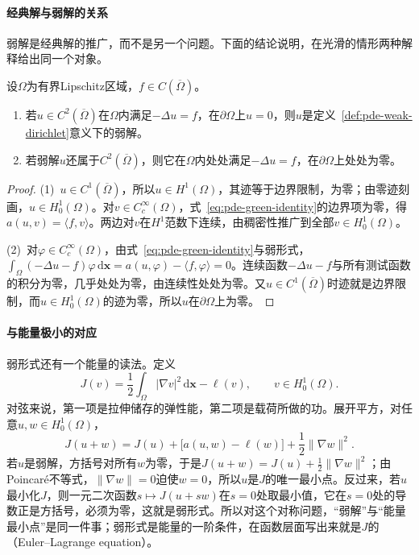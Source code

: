 \paragraph{经典解与弱解的关系}
弱解是经典解的推广，而不是另一个问题。下面的结论说明，在光滑的情形两种解释给出同一个对象。

\begin{theorem}[经典解与弱解]
\label{thm:pde-classical-weak}
设$\Omega$为有界Lipschitz区域，$f\in C(\overline\Omega)$。
\begin{enumerate}
  \item 若$u\in C^2(\overline\Omega)$在$\Omega$内满足$-\Delta u=f$，在$\partial\Omega$上$u=0$，则$u$是定义~\ref{def:pde-weak-dirichlet}意义下的弱解。
  \item 若弱解$u$还属于$C^2(\overline\Omega)$，则它在$\Omega$内处处满足$-\Delta u=f$，在$\partial\Omega$上处处为零。
\end{enumerate}
\end{theorem}

\begin{proof}
(1)~$u\in C^1(\overline\Omega)$，所以$u\in H^1(\Omega)$，其迹等于边界限制，为零；由零迹刻画，$u\in H_0^1(\Omega)$。对$v\in C_c^\infty(\Omega)$，式~\eqref{eq:pde-green-identity}的边界项为零，得$a(u,v)=\langle f,v\rangle$。两边对$v$在$H^1$范数下连续，由稠密性推广到全部$v\in H_0^1(\Omega)$。

(2)~对$\varphi\in C_c^\infty(\Omega)$，由式~\eqref{eq:pde-green-identity}与弱形式，$\int_\Omega(-\Delta u-f)\varphi\,\mathrm d\bm x=a(u,\varphi)-\langle f,\varphi\rangle=0$。连续函数$-\Delta u-f$与所有测试函数的积分为零，几乎处处为零，由连续性处处为零。又$u\in C^1(\overline\Omega)$时迹就是边界限制，而$u\in H_0^1(\Omega)$的迹为零，所以$u$在$\partial\Omega$上为零。
\end{proof}

\paragraph{与能量极小的对应}
弱形式还有一个能量的读法。定义
\begin{equation}
  J(v)=\frac12\int_\Omega|\nabla v|^2\,\mathrm d\bm x-\ell(v),\qquad v\in H_0^1(\Omega).
  \label{eq:pde-dirichlet-energy}
\end{equation}
对弦来说，第一项是拉伸储存的弹性能，第二项是载荷所做的功。展开平方，对任意$u,w\in H_0^1(\Omega)$，
\begin{equation}
  J(u+w)=J(u)+\bigl[a(u,w)-\ell(w)\bigr]+\frac12\|\nabla w\|^2 .
  \label{eq:pde-energy-expansion}
\end{equation}
若$u$是弱解，方括号对所有$w$为零，于是$J(u+w)=J(u)+\tfrac12\|\nabla w\|^2$；由Poincaré不等式，$\|\nabla w\|=0$迫使$w=0$，所以$u$是$J$的唯一最小点。反过来，若$u$最小化$J$，则一元二次函数$s\mapsto J(u+sw)$在$s=0$处取最小值，它在$s=0$处的导数正是方括号，必须为零，这就是弱形式。所以对这个对称问题，“弱解”与“能量最小点”是同一件事；弱形式是能量的一阶条件，在函数层面写出来就是$J$的（Euler--Lagrange equation）。

